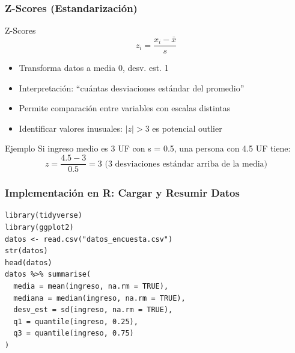 \documentclass[aspectratio=169,11pt]{beamer}
\begin{document}
\begin{frame}[fragile]
\frametitle{Z-Scores (Estandarización)}

\begin{block}{Z-Scores}
  $$z_i = \frac{x_i - \bar{x}}{s}$$

  \begin{itemize}
    \item Transforma datos a media 0, desv. est. 1
    \item Interpretación: ``cuántas desviaciones estándar del promedio''
    \item Permite comparación entre variables con escalas distintas
    \item Identificar valores inusuales: $|z| > 3$ es potencial outlier
  \end{itemize}
\end{block}

\pause

\begin{exampleblock}{Ejemplo}
  Si ingreso medio es 3 UF con s = 0.5, una persona con 4.5 UF tiene:
  $$z = \frac{4.5 - 3}{0.5} = 3 \text{ (3 desviaciones estándar arriba de la media)}$$
\end{exampleblock}
\end{frame}

\begin{frame}[fragile]
\frametitle{Implementación en R: Cargar y Resumir Datos}

\begin{lstlisting}[basicstyle=\ttfamily\tiny]
library(tidyverse)
library(ggplot2)
datos <- read.csv("datos_encuesta.csv")
str(datos)
head(datos)
datos %>% summarise(
  media = mean(ingreso, na.rm = TRUE),
  mediana = median(ingreso, na.rm = TRUE),
  desv_est = sd(ingreso, na.rm = TRUE),
  q1 = quantile(ingreso, 0.25),
  q3 = quantile(ingreso, 0.75)
)
\end{lstlisting}
\end{frame}
\end{document}
